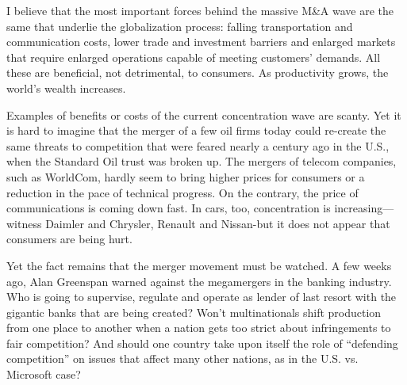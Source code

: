 I believe that the most important forces behind the massive M\&A wave
are the same that underlie the globalization process: falling
transportation and communication costs, lower trade and investment
barriers and enlarged markets that require enlarged operations capable
of meeting customers' demands. All these are beneficial, not
detrimental, to consumers. As productivity grows, the world's wealth
increases.

Examples of benefits or costs of the current concentration wave are
scanty. Yet it is hard to imagine that the merger of a few oil firms
today could re-create the same threats to competition that were feared
nearly a century ago in the U.S., when the Standard Oil trust was broken
up. The mergers of telecom companies, such as WorldCom, hardly seem to
bring higher prices for consumers or a reduction in the pace of
technical progress. On the contrary, the price of communications is
coming down fast. In cars, too, concentration is increasing---witness
Daimler and Chrysler, Renault and Nissan-but it does not appear that
consumers are being hurt.

Yet the fact remains that the merger movement must be watched. A few
weeks ago, Alan Greenspan warned against the megamergers in the banking
industry. Who is going to supervise, regulate and operate as lender of
last resort with the gigantic banks that are being created? Won't
multinationals shift production from one place to another when a nation
gets too strict about infringements to fair competition? And should one
country take upon itself the role of ``defending competition'' on issues
that affect many other nations, as in the U.S. vs. Microsoft case?


